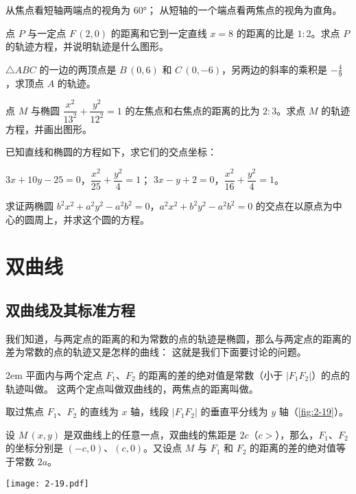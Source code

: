 \begin{Exercise}
\begin{question}
    \begin{tasks}
      \task 从焦点看短轴两端点的视角为 \ang{60}；
      \task 从短轴的一个端点看两焦点的视角为直角。
    \end{tasks}
    \item 点 $P$ 与一定点 $F\,(2,0)$ 的距离和它到一定直线 $x=8$ 的距离的比是 $1:2$。求点 $P$ 的轨迹方程，并说明轨迹是什么图形。
    \item $\triangle ABC$ 的一边的两顶点是 $B\,(0,6)$ 和 $C\,(0,-6)$，另两边的斜率的乘积是 $-\frac{4}{9}$，求顶点 $A$ 的轨迹。
    \item 点 $M$ 与椭圆 $\dfrac{x^2}{13^2}+\dfrac{y^2}{12^2}=1$ 的左焦点和右焦点的距离的比为 $2:3$。求点 $M$ 的轨迹方程，并画出图形。
    \item 已知直线和椭圆的方程如下，求它们的交点坐标：
    \begin{tasks}
      \task $3x+10y-25=0$，$\dfrac{x^2}{25}+\dfrac{y^2}{4}=1$；
      \task $3x-y+2=0$，$\dfrac{x^2}{16}+\dfrac{y^2}{4}=1$。
    \end{tasks}
    \item 求证两椭圆 $b^2x^2+a^2y^2-a^2b^2=0$，$a^2x^2+b^2y^2-a^2b^2=0$ 的交点在以原点为中心的圆周上，并求这个圆的方程。
  \end{question}
\end{Exercise}

\section{双曲线}
\subsection{双曲线及其标准方程}
我们知道，与两定点的距离的和为常数的点的轨迹是椭圆，那么与两定点的距离的差为常数的点的轨迹又是怎样的曲线： 这就是我们下面要讨论的问题。

\medskip\noindent
\begin{minipage}{0.6\linewidth}\parindent2em
平面内与两个定点 $F_1$、$F_2$ 的距离的差的绝对值是常数（小于 $|F_1F_2|$）的点的轨迹叫做。
这两个定点叫做双曲线的，两焦点的距离叫做。

取过焦点 $F_1$、$F_2$ 的直线为 $x$ 轴，线段 $|F_1F_2|$ 的垂直平分线为 $y$ 轴（\cref{fig:2-19}）。

设 $M\,(x,y)$ 是双曲线上的任意一点，双曲线的焦距是 $2c$（$c>$），那么，$F_1$、$F_2$ 的坐标分别是 $(-c,0)$、$(c,0)$。又设点 $M$ 与 $F_1$ 和 $F_2$ 的距离的差的绝对值等于常数 $2a$。
\end{minipage}\hfill
\begin{minipage}{0.35\linewidth}\centering
  \begin{figurehere}
    \texttt{[image: 2-19.pdf]}
    \caption{}\label{fig:2-19}
  \end{figurehere}
\end{minipage}

